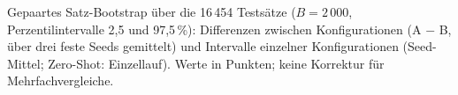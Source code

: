 \begin{table}[htbp]
  \centering
  \caption[Bootstrap-Konfidenzintervalle für Mikro- und Makro-F$_1$]{Gepaartes
  Satz-Bootstrap über die 16\,454 Testsätze ($B = 2\,000$,
  Perzentilintervalle 2,5 und 97,5\,\%): Differenzen zwischen
  Konfigurationen (A $-$ B, über drei feste Seeds gemittelt) und
  Intervalle einzelner Konfigurationen (Seed-Mittel; Zero-Shot:
  Einzellauf). Werte in Punkten; keine Korrektur für Mehrfachvergleiche.}
  \label{tab:ci}
  \scriptsize
  \setlength{\tabcolsep}{1.6pt}
  
\end{table}
